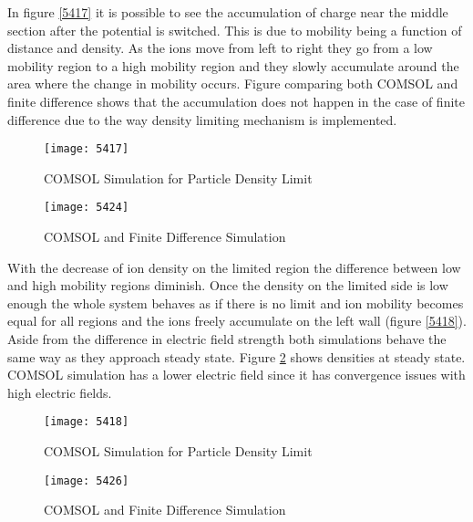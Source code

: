 \begin{doublespace}
In figure \ref{5417} it is possible to see the accumulation of charge near the middle section after the potential is switched. This is due to mobility being a function of distance and density. As the ions move from left to right they go from a low mobility region to a high mobility region and they slowly accumulate around the area where the change in mobility occurs. Figure comparing both COMSOL and finite difference shows that the accumulation does not happen in the case of finite difference due to the way density limiting mechanism is implemented.

\begin{figure}[ht]
\centering
\begin{minipage}[b]{0.45\linewidth}
\texttt{[image: 5417]}
\caption{COMSOL Simulation for Particle Density Limit}
\label{5417}
\end{minipage}
\quad
\begin{minipage}[b]{0.45\linewidth}
\texttt{[image: 5424]}
\caption{COMSOL and Finite Difference Simulation}
\label{5424}
\end{minipage}
\end{figure}

With the decrease of ion density on the limited region the difference between low and high mobility regions diminish. Once the density on the limited side is low enough the whole system behaves as if there is no limit and ion mobility becomes equal for all regions and the ions freely accumulate on the left wall (figure \ref{5418}). Aside from the difference in electric field strength both simulations behave the same way as they approach steady state. Figure \ref{5426} shows densities at steady state. COMSOL simulation has a lower electric field since it has convergence issues with high electric fields. 

\begin{figure}[ht]
\centering
\begin{minipage}[b]{0.45\linewidth}
\texttt{[image: 5418]}
\caption{COMSOL Simulation for Particle Density Limit}
\label{5418}
\end{minipage}
\quad
\begin{minipage}[b]{0.45\linewidth}
\texttt{[image: 5426]}
\caption{COMSOL and Finite Difference Simulation}
\label{5426}
\end{minipage}
\end{figure}


\end{doublespace}
